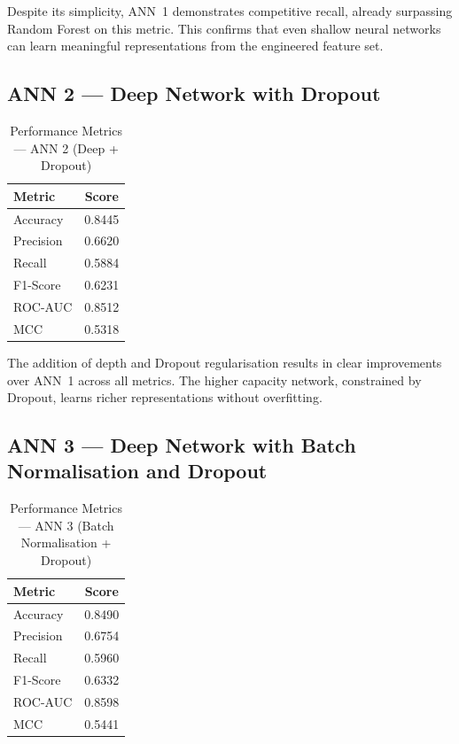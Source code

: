 Despite its simplicity, ANN~1 demonstrates competitive recall, already surpassing Random Forest on this metric. This confirms that even shallow neural networks can learn meaningful representations from the engineered feature set.

\subsection{ANN 2 — Deep Network with Dropout}

\begin{table}[H]
    \centering
    \caption{Performance Metrics — ANN 2 (Deep + Dropout)}
    \label{tab:ann2_metrics}
    \vspace{3mm}
    \begin{tabular}{|l|c|}
        \hline
        \textbf{Metric} & \textbf{Score} \\
        \hline
        Accuracy   & 0.8445 \\
        \hline
        Precision  & 0.6620 \\
        \hline
        Recall     & 0.5884 \\
        \hline
        F1-Score   & 0.6231 \\
        \hline
        ROC-AUC    & 0.8512 \\
        \hline
        MCC        & 0.5318 \\
        \hline
    \end{tabular}
\end{table}

The addition of depth and Dropout regularisation results in clear improvements over ANN~1 across all metrics. The higher capacity network, constrained by Dropout, learns richer representations without overfitting.

\subsection{ANN 3 — Deep Network with Batch Normalisation and Dropout}

\begin{table}[H]
    \centering
    \caption{Performance Metrics — ANN 3 (Batch Normalisation + Dropout)}
    \label{tab:ann3_metrics}
    \vspace{3mm}
    \begin{tabular}{|l|c|}
        \hline
        \textbf{Metric} & \textbf{Score} \\
        \hline
        Accuracy   & 0.8490 \\
        \hline
        Precision  & 0.6754 \\
        \hline
        Recall     & 0.5960 \\
        \hline
        F1-Score   & 0.6332 \\
        \hline
        ROC-AUC    & 0.8598 \\
        \hline
        MCC        & 0.5441 \\
        \hline
    \end{tabular}
\end{table}

